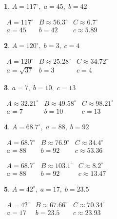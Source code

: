 \documentclass{amsbook}
\newtheorem{exc}{}
\newenvironment{ex}{\begin{exc}\normalfont}{\end{exc}}
\numberwithin{section}{chapter}
\numberwithin{equation}{chapter}
\begin{document}
\begin{multicols}{2}
\begin{ex}
	 $A = 117^{\circ}, \; a = 45, \; b = 42$
	\begin{sol}
		$\begin{array}{lll}
		A = 117^{\circ} & B \approx 56.3^{\circ} & C \approx 6.7^{\circ} \\
		a = 45 & b = 42 & c \approx 5.89 \end{array}$
	\end{sol}
\end{ex}


\begin{ex}
	$A = 120^{\circ}, \; b = 3, \; c = 4$
	\begin{sol}
		 $\begin{array}{lll}
		A = 120^{\circ} & B \approx 25.28^{\circ} & C \approx 34.72^{\circ} \\
		a = \sqrt{37} & b = 3 & c = 4 \end{array}$
	\end{sol}
\end{ex}
\begin{ex}
	$a = 7, \; b = 10, \; c = 13$ 
	\begin{sol}
		 $\begin{array}{lll}
		A \approx 32.21^{\circ} & B \approx 49.58^{\circ} & C \approx 98.21^{\circ} \\
		a = 7 & b = 10 & c = 13 \end{array}$
	\end{sol}
\end{ex}

\begin{ex}
	$A = 68.7^{\circ}, \; a = 88, \; b = 92$
	\begin{sol}
		 $\begin{array}{lll}
		A = 68.7^{\circ} & B \approx 76.9^{\circ} & C \approx 34.4^{\circ} \\
		a = 88 & b = 92 & c \approx 53.36 \end{array}$
		
		$\begin{array}{lll}
		A = 68.7^{\circ} & B \approx 103.1^{\circ} & C \approx 8.2^{\circ} \\
		a = 88 & b = 92 & c \approx 13.47\end{array}$
	\end{sol}
\end{ex}

\begin{ex}
	 $A = 42^{\circ}, \; a = 17, \; b = 23.5$
	\begin{sol}
	 $\begin{array}{lll}
	A = 42^{\circ} & B \approx 67.66^{\circ} & C \approx 70.34^{\circ} \\
	a = 17 & b = 23.5 & c \approx 23.93 \end{array}$
	

\end{sol}
\end{ex}
\end{multicols}
\end{document}
